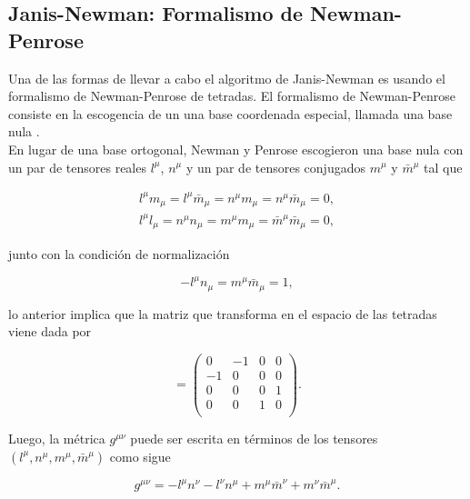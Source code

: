 \subsection{Janis-Newman: Formalismo de Newman-Penrose}

Una de las formas de llevar a cabo el algoritmo de Janis-Newman es usando el formalismo de Newman-Penrose de tetradas. El formalismo de Newman-Penrose consiste en la escogencia de un una base coordenada especial, llamada una base nula \cite{ThePotentialOfFildsInEinstein}.\\

En lugar de una base ortogonal, Newman y Penrose escogieron una base nula con un par de tensores reales $l^\mu$, $n^\mu$ y un par de tensores conjugados $m^\mu$ y $\bar{m}^\mu$ tal que

\begin{gather}
    l^\mu m_\mu = l^\mu \bar{m}_\mu = n^\mu m_\mu = n^\mu \bar{m}_\mu = 0, \label{eq:Nulity0}\\
    l^\mu l_\mu = n^\mu n_\mu = m^\mu m_\mu = \bar{m}^\mu\bar{m}_\mu = 0, \label{eq:Nulity1}
\end{gather}

junto con la condición de normalización 

\begin{equation}
    -l^\mu n_\mu = m^\mu \bar{m}_\mu = 1,
    \label{eq:Unitarity}
\end{equation}

lo anterior implica que la matriz que transforma en el espacio de las tetradas viene dada por

\begin{equation}
    [\eta_{(a)(b)}]=\begin{pmatrix}
        0 & -1 & 0 & 0 \\
        -1 & 0 & 0 & 0 \\
        0 & 0 & 0 & 1 \\
        0 & 0 & 1 & 0 \\
    \end{pmatrix}.
\end{equation}

Luego, la métrica $g^{\mu\nu}$ puede ser escrita en términos de los tensores $(l^\mu,n^\mu,m^\mu,\bar{m}^\mu)$ como sigue \cite{ThePotentialOfFildsInEinstein}

\begin{equation}
    g^{\mu\nu}=-l^\mu n^\nu-l^\nu n^\mu+m^\mu \bar{m}^\nu+m^\nu \bar{m}^\mu.
    \label{eq:TetradMetric}
\end{equation}

